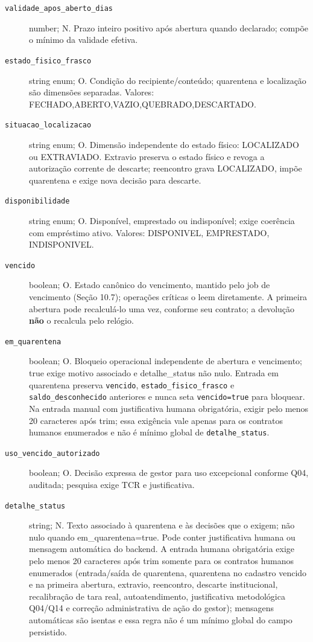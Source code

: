 \begin{description}
\item[\texttt{validade\_apos\_aberto\_dias}] number; N. Prazo inteiro positivo após abertura quando declarado; compõe o mínimo da validade efetiva.
\item[\texttt{estado\_fisico\_frasco}] string enum; O. Condição do recipiente/conteúdo; quarentena e localização são dimensões separadas. Valores: FECHADO,ABERTO,VAZIO,QUEBRADO,DESCARTADO.
\item[\texttt{situacao\_localizacao}] string enum; O. Dimensão independente do estado físico: LOCALIZADO ou EXTRAVIADO. Extravio preserva o estado físico e revoga a autorização corrente de descarte; reencontro grava LOCALIZADO, impõe quarentena e exige nova decisão para descarte.
\item[\texttt{disponibilidade}] string enum; O. Disponível, emprestado ou indisponível; exige coerência com empréstimo ativo. Valores: DISPONIVEL, EMPRESTADO, INDISPONIVEL.
\item[\texttt{vencido}] boolean; O. Estado canônico do vencimento, mantido pelo job de vencimento (Seção 10.7); operações críticas o leem diretamente. A primeira abertura pode recalculá-lo uma vez, conforme seu contrato; a devolução \textbf{não} o recalcula pelo relógio.
\item[\texttt{em\_quarentena}] boolean; O. Bloqueio operacional independente de abertura e vencimento; true exige motivo associado e detalhe\_status não nulo. Entrada em quarentena preserva \texttt{vencido}, \texttt{estado\_fisico\_frasco} e \texttt{saldo\_desconhecido} anteriores e nunca seta \texttt{vencido=true} para bloquear. Na entrada manual com justificativa humana obrigatória, exigir pelo menos 20 caracteres após trim; essa exigência vale apenas para os contratos humanos enumerados e não é mínimo global de \texttt{detalhe\_status}.
\item[\texttt{uso\_vencido\_autorizado}] boolean; O. Decisão expressa de gestor para uso excepcional conforme Q04, auditada; pesquisa exige TCR e justificativa.
\item[\texttt{detalhe\_status}] string; N. Texto associado à quarentena e às decisões que o exigem; não nulo quando em\_quarentena=true. Pode conter justificativa humana ou mensagem automática do backend. A entrada humana obrigatória exige pelo menos 20 caracteres após trim somente para os contratos humanos enumerados (entrada/saída de quarentena, quarentena no cadastro vencido e na primeira abertura, extravio, reencontro, descarte institucional, recalibração de tara real, autoatendimento, justificativa metodológica Q04/Q14 e correção administrativa de ação do gestor); mensagens automáticas são isentas e essa regra não é um mínimo global do campo persistido.

\end{description}
